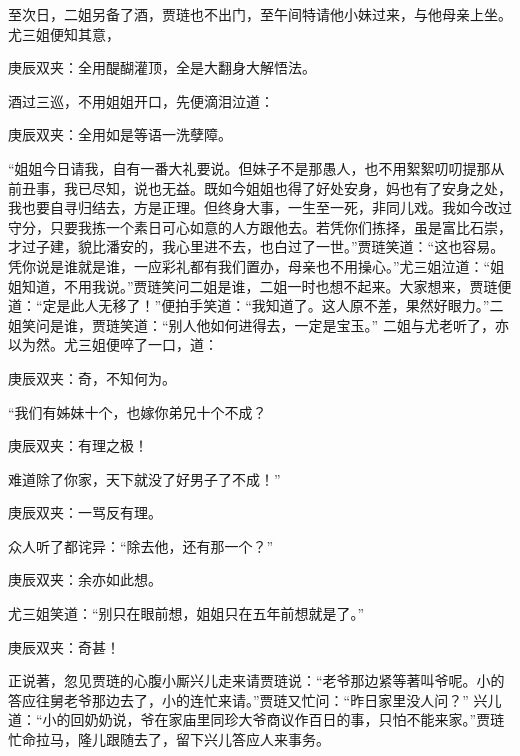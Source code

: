 \begin{parag}
    至次日，二姐另备了酒，贾琏也不出门，至午间特请他小妹过来，与他母亲上坐。尤三姐便知其意，\begin{note}庚辰双夹：全用醍醐灌顶，全是大翻身大解悟法。\end{note}酒过三巡，不用姐姐开口，先便滴泪泣道：\begin{note}庚辰双夹：全用如是等语一洗孽障。\end{note}“姐姐今日请我，自有一番大礼要说。但妹子不是那愚人，也不用絮絮叨叨提那从前丑事，我已尽知，说也无益。既如今姐姐也得了好处安身，妈也有了安身之处，我也要自寻归结去，方是正理。但终身大事，一生至一死，非同儿戏。我如今改过守分，只要我拣一个素日可心如意的人方跟他去。若凭你们拣择，虽是富比石崇，才过子建，貌比潘安的，我心里进不去，也白过了一世。”贾琏笑道：“这也容易。凭你说是谁就是谁，一应彩礼都有我们置办，母亲也不用操心。”尤三姐泣道：“姐姐知道，不用我说。”贾琏笑问二姐是谁，二姐一时也想不起来。大家想来，贾琏便道：“定是此人无移了！”便拍手笑道：“我知道了。这人原不差，果然好眼力。”二姐笑问是谁，贾琏笑道：“别人他如何进得去，一定是宝玉。” 二姐与尤老听了，亦以为然。尤三姐便啐了一口，道：\begin{note}庚辰双夹：奇，不知何为。\end{note}“我们有姊妹十个，也嫁你弟兄十个不成？\begin{note}庚辰双夹：有理之极！\end{note}难道除了你家，天下就没了好男子了不成！”\begin{note}庚辰双夹：一骂反有理。\end{note}众人听了都诧异：“除去他，还有那一个？”\begin{note}庚辰双夹：余亦如此想。\end{note}尤三姐笑道：“别只在眼前想，姐姐只在五年前想就是了。”\begin{note}庚辰双夹：奇甚！\end{note}
\end{parag}


\begin{parag}
    正说著，忽见贾琏的心腹小厮兴儿走来请贾琏说：“老爷那边紧等著叫爷呢。小的答应往舅老爷那边去了，小的连忙来请。”贾琏又忙问：“昨日家里没人问？” 兴儿道：“小的回奶奶说，爷在家庙里同珍大爷商议作百日的事，只怕不能来家。”贾琏忙命拉马，隆儿跟随去了，留下兴儿答应人来事务。
\end{parag}


